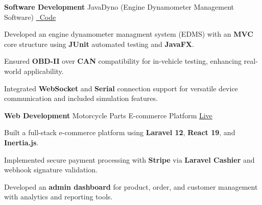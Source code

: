 
\begin{cventries}

\cventry
{\textbf{Software Development}} %
{JavaDyno (Engine Dynamometer Management Software)} %
{\href{https://github.com/TodeschiMatteo/OOP24-java-dyno}{\faGithub \ Code}} %
{} %
{
\begin{cvitems} %
\item {Developed an engine dynamometer managment system (EDMS) with an \textbf{MVC} core structure using \textbf{JUnit} automated testing and \textbf{JavaFX}.}
\item {Ensured \textbf{OBD-II} over \textbf{CAN} compatibility for in-vehicle testing, enhancing real-world applicability.}
\item {Integrated \textbf{WebSocket} and \textbf{Serial} connection support for versatile device communication and included simulation features.}
\end{cvitems}
}

\cventry
{\textbf{Web Development}} %
{Motorcycle Parts E-commerce Platform} %
{\href{https://rsp-industries.com}{Live}} %
{} %
{
\begin{cvitems}
\item {Built a full-stack e-commerce platform using \textbf{Laravel 12}, \textbf{React 19}, and \textbf{Inertia.js}.}
\item {Implemented secure payment processing with \textbf{Stripe} via \textbf{Laravel Cashier} and webhook signature validation.}
\item {Developed an \textbf{admin dashboard} for product, order, and customer management with analytics and reporting tools.}
\end{cvitems}
}



\end{cventries}
